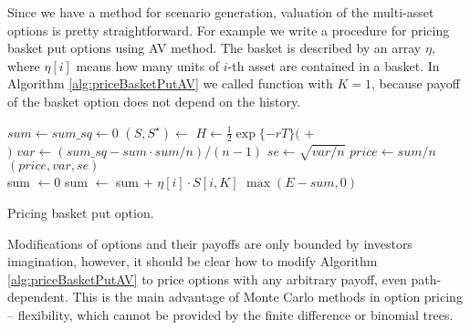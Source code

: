 \documentclass[a4paper,11pt, twoside]{book}
\theoremstyle{definition}
\theoremstyle{remark}
\newcounter{example}[chapter]
\begin{document}
Since we have a method for scenario generation, valuation of the multi-asset options is pretty straightforward. For example we write a procedure for pricing basket put options using AV method. The basket is described by an array $\eta$, where $\eta[i]$ means how many units of $i$-th asset are contained in a basket. In Algorithm \ref{alg:priceBasketPutAV} we called function  with $K=1$, because payoff of the basket option does not depend on the history. 

\begin{algorithm}
 \begin{algorithmic}[1]
  \State  $sum \gets sum\_sq \gets 0$
    \State $(S, S^\star) \gets$ 
    \State $H \gets \frac{1}{2}\exp\{-rT\} ($  +\\ 
    \hspace{132pt}  $)$
  \EndFor
  \State $var \gets (sum\_sq - sum \cdot sum/n) / (n-1)$
  \State $se \gets \sqrt{var / n}$
  \State $price \gets sum / n$
  \State \Return $(price, var, se)$
  \EndFunction
  \\
    \State sum $\gets 0$
      \State sum $\gets$ sum + $\eta[i]\cdot S[i, K]$
    \EndFor
    \State \Return $\max(E - sum, 0)$
  \EndFunction
 \end{algorithmic}
 \caption{Pricing basket put option.}
 \label{alg:priceBasketPutAV}
\end{algorithm}


Modifications of options and their payoffs are only bounded by investors imagination, however, it should be clear how to modify Algorithm \ref{alg:priceBasketPutAV} to price options with any arbitrary payoff, even path-dependent. This is the main advantage of Monte Carlo methods in option pricing -- flexibility, which cannot be provided by the finite difference or binomial trees.
\end{document}
